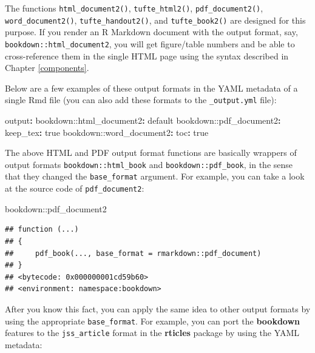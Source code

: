 \documentclass[
  12pt,
]{krantz}
\newenvironment{Shaded}{\begin{snugshade}}{\end{snugshade}}
\newcommand{\AttributeTok}[1]{\textcolor[rgb]{0.77,0.63,0.00}{#1}}
\newcommand{\CharTok}[1]{\textcolor[rgb]{0.31,0.60,0.02}{#1}}
\newcommand{\FunctionTok}[1]{\textcolor[rgb]{0.00,0.00,0.00}{#1}}
\newcommand{\KeywordTok}[1]{\textcolor[rgb]{0.13,0.29,0.53}{\textbf{#1}}}
\newcommand{\NormalTok}[1]{#1}
\newcommand{\SpecialCharTok}[1]{\textcolor[rgb]{0.00,0.00,0.00}{#1}}
\theoremstyle{definition}
\theoremstyle{definition}
\theoremstyle{definition}
\theoremstyle{definition}
\theoremstyle{remark}
\begin{document}
The functions \texttt{html\_document2()}, \texttt{tufte\_html2()}, \texttt{pdf\_document2()}, \texttt{word\_document2()}, \texttt{tufte\_handout2()}, and \texttt{tufte\_book2()} are designed for this purpose. If you render an R Markdown document with the output format, say, \texttt{bookdown::html\_document2}, you will get figure/table numbers and be able to cross-reference them in the single HTML page using the syntax described in Chapter \ref{components}.

Below are a few examples of these output formats in the YAML metadata of a single Rmd file (you can also add these formats to the \texttt{\_output.yml} file):

\begin{Shaded}
\begin{Highlighting}[]
\FunctionTok{output}\KeywordTok{:}
\AttributeTok{  bookdown:}\FunctionTok{:html\_document2}\KeywordTok{:}\AttributeTok{ default}
\AttributeTok{  bookdown:}\FunctionTok{:pdf\_document2}\KeywordTok{:}
\AttributeTok{    }\FunctionTok{keep\_tex}\KeywordTok{:}\AttributeTok{ }\CharTok{true}
\AttributeTok{  bookdown:}\FunctionTok{:word\_document2}\KeywordTok{:}
\AttributeTok{    }\FunctionTok{toc}\KeywordTok{:}\AttributeTok{ }\CharTok{true}
\end{Highlighting}
\end{Shaded}

The above HTML and PDF output format functions are basically wrappers of output formats \texttt{bookdown::html\_book} and \texttt{bookdown::pdf\_book}, in the sense that they changed the \texttt{base\_format} argument. For example, you can take a look at the source code of \texttt{pdf\_document2}:

\begin{Shaded}
\begin{Highlighting}[]
\NormalTok{bookdown}\SpecialCharTok{::}\NormalTok{pdf\_document2}
\end{Highlighting}
\end{Shaded}

\begin{verbatim}
## function (...) 
## {
##     pdf_book(..., base_format = rmarkdown::pdf_document)
## }
## <bytecode: 0x000000001cd59b60>
## <environment: namespace:bookdown>
\end{verbatim}

After you know this fact, you can apply the same idea to other output formats by using the appropriate \texttt{base\_format}. For example, you can port the \textbf{bookdown} features to the \texttt{jss\_article} format in the \textbf{rticles} package \citep{R-rticles} by using the YAML metadata:
\end{document}
